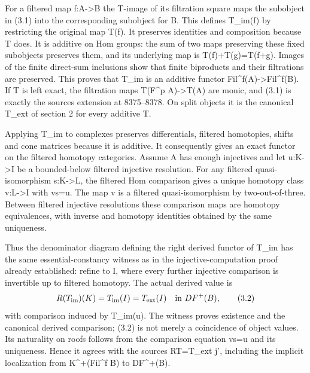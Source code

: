 For a filtered map f:\allowbreak{}A\allowbreak{}->B the T-image of its filtration square maps the subobject in (3.1)\allowbreak{} into the corresponding subobject for B. This defines T\_\allowbreak{}im(f)\allowbreak{} by restricting the original map T(f)\allowbreak{}. It preserves identities and composition because T does. It is additive on Hom groups:\allowbreak{} the sum of two maps preserving these fixed subobjects preserves them,\allowbreak{} and its underlying map is T(f)\allowbreak{}\allowbreak{}+T(g)\allowbreak{}\allowbreak{}=T(f\allowbreak{}+g)\allowbreak{}. Images of the finite direct-sum inclusions show that finite biproducts and their filtrations are preserved. This proves that T\_\allowbreak{}im is an additive functor Fil\textasciicircum{}f(A)\allowbreak{}\allowbreak{}->Fil\textasciicircum{}f(B)\allowbreak{}. If T is left exact,\allowbreak{} the filtration maps T(F\^{}p A)\allowbreak{}\allowbreak{}->T(A)\allowbreak{} are monic,\allowbreak{} and (3.1)\allowbreak{} is exactly the source\textquotesingle s extension at 8375–\allowbreak{}8378. On split objects it is the canonical T\_\allowbreak{}ext of section 2 for every additive T.

Applying T\_\allowbreak{}im to complexes preserves differentials,\allowbreak{} filtered homotopies,\allowbreak{} shifts and cone matrices because it is additive. It consequently gives an exact functor on the filtered homotopy categories. Assume A has enough injectives and let u:\allowbreak{}K\allowbreak{}->I be a bounded-below filtered injective resolution. For any filtered quasi-isomorphism s:\allowbreak{}K\allowbreak{}->L,\allowbreak{} the filtered Hom comparison gives a unique homotopy class v:\allowbreak{}L\allowbreak{}->I with vs\allowbreak{}=u. The map v is a filtered quasi-isomorphism by two-out-of-three. Between filtered injective resolutions these comparison maps are homotopy equivalences,\allowbreak{} with inverse and homotopy identities obtained by the same uniqueness.

Thus the denominator diagram defining the right derived functor of T\_\allowbreak{}im has the same essential-constancy witness as in the injective-computation proof already established:\allowbreak{} refine to I,\allowbreak{} where every further injective comparison is invertible up to filtered homotopy. The actual derived value is \[
 R(T_{\rm im})(K)=T_{\rm im}(I)=T_{\rm ext}(I)
       \quad\text{in }DF^+(B),                              \tag{3.2}
\] with comparison induced by T\_\allowbreak{}im(u)\allowbreak{}. The witness proves existence and the canonical derived comparison; (3.2)\allowbreak{} is not merely a coincidence of object values. Its naturality on roofs follows from the comparison equation vs\allowbreak{}=u and its uniqueness. Hence it agrees with the source\textquotesingle s RT\allowbreak{}=T\_\allowbreak{}ext j',\allowbreak{} including the implicit localization from K\textasciicircum{}\allowbreak{}+(Fil\textasciicircum{}f B)\allowbreak{} to DF\textasciicircum{}\allowbreak{}+(B)\allowbreak{}.

